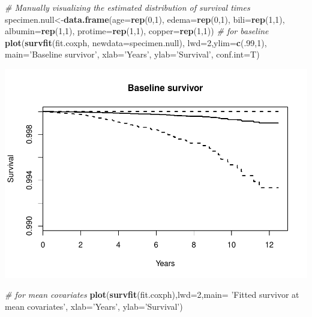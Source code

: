 \documentclass[]{article}
\newenvironment{Shaded}{\begin{snugshade}}{\end{snugshade}}
\newcommand{\KeywordTok}[1]{\textcolor[rgb]{0.13,0.29,0.53}{\textbf{#1}}}
\newcommand{\DataTypeTok}[1]{\textcolor[rgb]{0.13,0.29,0.53}{#1}}
\newcommand{\DecValTok}[1]{\textcolor[rgb]{0.00,0.00,0.81}{#1}}
\newcommand{\StringTok}[1]{\textcolor[rgb]{0.31,0.60,0.02}{#1}}
\newcommand{\CommentTok}[1]{\textcolor[rgb]{0.56,0.35,0.01}{\textit{#1}}}
\newcommand{\NormalTok}[1]{#1}
\begin{document}
\begin{Shaded}
\begin{Highlighting}[]
\CommentTok{# Manually visualizing the estimated distribution of survival times}
\NormalTok{specimen.null<-}\KeywordTok{data.frame}\NormalTok{(}\DataTypeTok{age=}\KeywordTok{rep}\NormalTok{(}\DecValTok{0}\NormalTok{,}\DecValTok{1}\NormalTok{), }\DataTypeTok{edema=}\KeywordTok{rep}\NormalTok{(}\DecValTok{0}\NormalTok{,}\DecValTok{1}\NormalTok{), }\DataTypeTok{bili=}\KeywordTok{rep}\NormalTok{(}\DecValTok{1}\NormalTok{,}\DecValTok{1}\NormalTok{), }\DataTypeTok{albumin=}\KeywordTok{rep}\NormalTok{(}\DecValTok{1}\NormalTok{,}\DecValTok{1}\NormalTok{), }\DataTypeTok{protime=}\KeywordTok{rep}\NormalTok{(}\DecValTok{1}\NormalTok{,}\DecValTok{1}\NormalTok{), }\DataTypeTok{copper=}\KeywordTok{rep}\NormalTok{(}\DecValTok{1}\NormalTok{,}\DecValTok{1}\NormalTok{))}
\CommentTok{# for baseline}
\KeywordTok{plot}\NormalTok{(}\KeywordTok{survfit}\NormalTok{(fit.coxph, }\DataTypeTok{newdata=}\NormalTok{specimen.null), }\DataTypeTok{lwd=}\DecValTok{2}\NormalTok{,}\DataTypeTok{ylim=}\KeywordTok{c}\NormalTok{(.}\DecValTok{99}\NormalTok{,}\DecValTok{1}\NormalTok{), }\DataTypeTok{main=}\StringTok{'Baseline survivor'}\NormalTok{, }\DataTypeTok{xlab=}\StringTok{'Years'}\NormalTok{, }\DataTypeTok{ylab=}\StringTok{'Survival'}\NormalTok{, }\DataTypeTok{conf.int=}\NormalTok{T)}
\end{Highlighting}
\end{Shaded}

\includegraphics{report_files/figure-latex/unnamed-chunk-21-1.pdf}

\begin{Shaded}
\begin{Highlighting}[]
\CommentTok{# for mean covariates}
\KeywordTok{plot}\NormalTok{(}\KeywordTok{survfit}\NormalTok{(fit.coxph),}\DataTypeTok{lwd=}\DecValTok{2}\NormalTok{,}\DataTypeTok{main=} \StringTok{'Fitted survivor at mean covariates'}\NormalTok{, }\DataTypeTok{xlab=}\StringTok{'Years'}\NormalTok{, }\DataTypeTok{ylab=}\StringTok{'Survival'}\NormalTok{)}
\end{Highlighting}
\end{Shaded}
\end{document}
